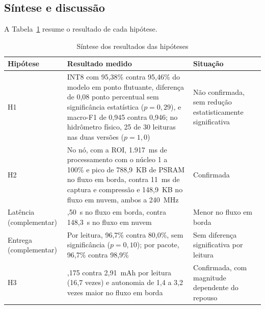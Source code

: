 \subsection{Síntese e discussão}
\label{subsec:sintese_resultados}

A Tabela~\ref{tab:sintese_hipoteses} resume o resultado de cada hipótese.

\begin{table}[H]
    \centering
    \caption{Síntese dos resultados das hipóteses}
    \label{tab:sintese_hipoteses}
    \begin{tabularx}{\textwidth}{@{}l>{\raggedright\arraybackslash}X>{\raggedright\arraybackslash}p{3.6cm}@{}}
        \toprule
        \textbf{Hipótese} & \textbf{Resultado medido} & \textbf{Situação} \\
        \midrule
        H1 & INT8 com 95,38\% contra 95,46\% do modelo em ponto flutuante, diferença de 0,08
        ponto percentual sem significância estatística ($p = 0{,}29$), e macro-F1 de 0,945
        contra 0,946; no hidrômetro físico, 25 de 30 leituras nas duas versões ($p = 1{,}0$) & Não confirmada, sem
        redução estatisticamente significativa \\
        \addlinespace
        H2 & No nó, com a ROI, 1.917~ms de processamento com o núcleo 1 a 100\% e pico de
        788,9~KB de PSRAM no fluxo em borda, contra 11~ms de captura e compressão e 148,9~KB no
        fluxo em nuvem, ambos a 240~MHz &
        Confirmada \\
        \addlinespace
        Latência (complementar) & 3,50~s no fluxo em borda, contra 148,3~s no fluxo em nuvem &
        Menor no fluxo em borda \\
        \addlinespace
        Entrega (complementar) & Por leitura, 96,7\% contra 80,0\%, sem significância
        ($p = 0{,}10$); por pacote, 96,7\% contra 98,9\% & Sem diferença significativa por
        leitura \\
        \addlinespace
        H3 & 0,175 contra 2,91~mAh por leitura (16,7 vezes) e autonomia de 1,4 a 3,2 vezes
        maior no fluxo em borda &
        Confirmada, com magnitude dependente do repouso \\
        \bottomrule
    \end{tabularx}
\end{table}

